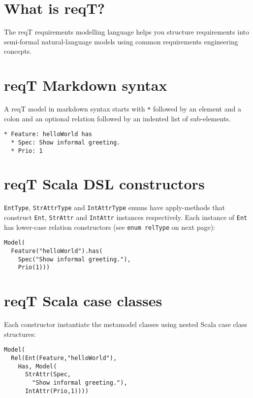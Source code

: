 \documentclass[a4paper,oneside]{article}
\begin{document}
\fontsize{9.0}{10.5}\selectfont

\begin{multicols*}{4}
\raggedright

\section*{What is reqT?}
The reqT requirements modelling language 
helps you structure requirements into semi-formal 
natural-language models using 
common requirements engineering concepts.




\section*{reqT Markdown syntax}
A reqT model in markdown syntax starts with \lstinline+*+ followed by an element and a colon and an optional relation followed by an indented list of sub-elements.

\begin{lstlisting}
* Feature: helloWorld has
  * Spec: Show informal greeting.
  * Prio: 1

\end{lstlisting}

\section*{reqT Scala DSL constructors}
\lstinline+EntType+, \lstinline+StrAttrType+ and \lstinline+IntAttrType+ enums have apply-methods that construct \lstinline+Ent+, \lstinline+StrAttr+ and \lstinline+IntAttr+ instances respectively. Each instance of \lstinline+Ent+ has lower-case relation constructors (see \lstinline+enum relType+ on next page):
\begin{lstlisting}
Model(
  Feature("helloWorld").has(
    Spec("Show informal greeting."),
    Prio(1)))

\end{lstlisting}


\section*{reqT Scala case classes}
Each constructor instantiate the metamodel classes using nested Scala case class structures:
\begin{lstlisting}
Model(
  Rel(Ent(Feature,"helloWorld"),
    Has, Model(
      StrAttr(Spec,
        "Show informal greeting."),
      IntAttr(Prio,1))))


\end{lstlisting}
\end{multicols*}
\end{document}
